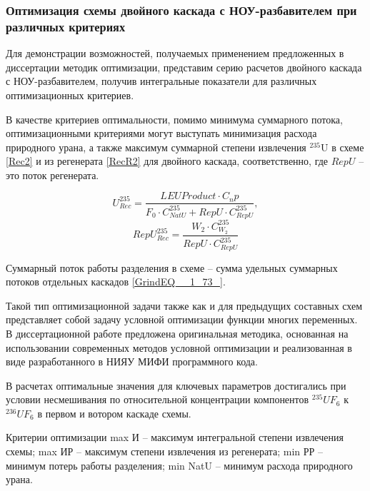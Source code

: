 \subsubsection{Оптимизация схемы двойного каскада с НОУ-разбавителем при различных критериях}

Для демонстрации возможностей, получаемых применением предложенных в диссертации методик оптимизации, представим серию расчетов двойного каскада с НОУ-разбавителем, получив интегральные показатели для различных оптимизационных критериев.

В качестве критериев оптимальности, помимо минимума суммарного потока, оптимизационными критериями могут выступать минимизация расхода природного урана, а также максимум суммарной степени извлечения $^{235}$U в схеме \ref{Rec2} и из регенерата \ref{RecR2} для двойного каскада, соответственно, где $RepU$ -- это поток регенерата.

\begin{equation} \label{Rec2} 
    U^{235}_{Rec} = \frac{LEU Product \cdot C_np}{F_0 \cdot C_{NatU}^{235} + RepU \cdot C_{RepU}^{235}}, 
\end{equation} 
\begin{equation} \label{RecR2} 
    RepU^{235}_{Rec} = \frac{W_2\cdot C_{W_2}^{235}}{RepU \cdot C_{RepU}^{235}}        
\end{equation} 

Суммарный поток работы разделения в схеме -- сумма удельных суммарных потоков отдельных каскадов \ref{GrindEQ__1_73_}.

Такой тип оптимизационной задачи также как и для предыдущих составных схем представляет собой задачу условной оптимизации функции многих переменных. В диссертационной работе предложена оригинальная методика, основанная на использовании современных методов условной оптимизации и реализованная в виде разработанного в НИЯУ МИФИ программного кода.

В расчетах оптимальные значения для ключевых параметров достигались при условии несмешивания по относительной концентрации компонентов $^{235}UF_6$ к $^{236}UF_6$ в первом и вотором каскаде схемы.

Критерии оптимизации max И -- максимум интегральной степени извлечения схемы; max ИР -- максимум степени извлечения из регенерата; min РР -- минимум потерь работы разделения; min NatU -- минимум расхода природного урана.


